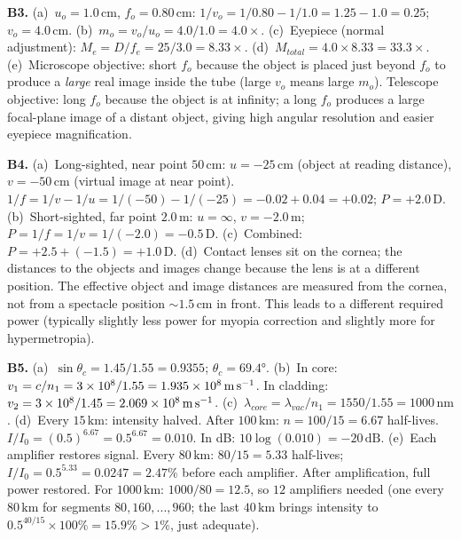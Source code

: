 \textbf{B3.}
(a)~$u_o=1.0\,\text{cm}$, $f_o=0.80\,\text{cm}$:
$1/v_o=1/0.80-1/1.0=1.25-1.0=0.25$;
$v_o=4.0\,\text{cm}$. \quad
(b)~$m_o=v_o/u_o=4.0/1.0=4.0\times$. \quad
(c)~Eyepiece (normal adjustment): $M_e=D/f_e
=25/3.0=8.33\times$. \quad
(d)~$M_{total}=4.0\times8.33=33.3\times$. \quad
(e)~Microscope objective: short $f_o$ because the
object is placed just beyond $f_o$ to produce a
\textit{large} real image inside the tube (large $v_o$
means large $m_o$). Telescope objective: long $f_o$
because the object is at infinity; a long $f_o$
produces a large focal-plane image of a distant object,
giving high angular resolution and easier eyepiece
magnification.

\textbf{B4.}
(a)~Long-sighted, near point $50\,\text{cm}$:
$u=-25\,\text{cm}$ (object at reading distance),
$v=-50\,\text{cm}$ (virtual image at near point).
$1/f=1/v-1/u=1/(-50)-1/(-25)=-0.02+0.04=+0.02$;
$P=+2.0\,\text{D}$. \quad
(b)~Short-sighted, far point $2.0\,\text{m}$:
$u=\infty$, $v=-2.0\,\text{m}$;
$P=1/f=1/v=1/(-2.0)=-0.5\,\text{D}$. \quad
(c)~Combined: $P=+2.5+(-1.5)=+1.0\,\text{D}$. \quad
(d)~Contact lenses sit on the cornea; the distances to
the objects and images change because the lens is at a
different position. The effective object and image
distances are measured from the cornea, not from a
spectacle position $\sim1.5\,\text{cm}$ in front.
This leads to a different required power (typically
slightly less power for myopia correction and slightly
more for hypermetropia).

\textbf{B5.}
(a)~$\sin\theta_c=1.45/1.55=0.9355$;
$\theta_c=69.4°$. \quad
(b)~In core: $v_1=c/n_1=3\times10^8/1.55
=1.935\times10^8\,\text{m\,s}^{-1}$.
In cladding: $v_2=3\times10^8/1.45
=2.069\times10^8\,\text{m\,s}^{-1}$. \quad
(c)~$\lambda_{core}=\lambda_{vac}/n_1
=1550/1.55=1000\,\text{nm}$. \quad
(d)~Every $15\,\text{km}$: intensity halved.
After $100\,\text{km}$: $n=100/15=6.67$ half-lives.
$I/I_0=(0.5)^{6.67}=0.5^{6.67}=0.010$.
In dB: $10\log(0.010)=-20\,\text{dB}$. \quad
(e)~Each amplifier restores signal. Every $80\,\text{km}$:
$80/15=5.33$ half-lives; $I/I_0=0.5^{5.33}=0.0247
=2.47\%$ before each amplifier. After amplification,
full power restored. For $1000\,\text{km}$:
$1000/80=12.5$, so $12$ amplifiers needed (one every
$80\,\text{km}$ for segments $80, 160,...,960$; the
last $40\,\text{km}$ brings intensity to
$0.5^{40/15}\times100\%=15.9\%>1\%$, just adequate).

\endgroup

